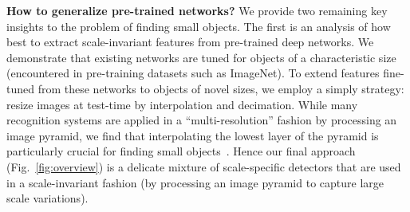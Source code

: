 \documentclass[10pt,twocolumn,letterpaper]{article}
\newcommand{\deva}[1]{\noindent \textcolor{red}{DEVA: #1}}
\begin{document}
\iffalse
\begin{figure}[t]
  \centering
  \texttt{[image: res/multi-task.pdf]}
  \caption{Traditional methods for recognizing objects across a range of scales aim for scale-invariant templates (left). This can be thought of as a large collection of scale-specific templates with shared parameters, where parameters are aligned into a canonical coordinate system by a geometric transformation. For example, a single set of model parameters are used to process both a 300x300 and 30x30 face. Alternatively, one can explicitly formalize scale-specific object detection as a multi-task problem (right) and let a (deep) feature representation algorithm {\em learn} how best to share features across different scales. \deva{Remove due to lack of space}.}
  \label{fig:multitask}
\end{figure}
\fi

{\bf How to generalize pre-trained networks?} We provide two remaining key insights to the problem of finding small objects. The first is an analysis of how best to extract scale-invariant features from pre-trained deep networks. We demonstrate that existing networks are tuned for objects of a characteristic size (encountered in pre-training datasets such as ImageNet).  To extend features fine-tuned from these networks to objects of novel sizes, we employ a simply strategy: resize images at test-time by interpolation and decimation. While many recognition systems are applied in a ``multi-resolution'' fashion by processing an image pyramid, we find that interpolating the lowest layer of the pyramid is particularly crucial for finding small objects~\cite{felzenszwalb2010object}. Hence our final approach  (Fig.~\ref{fig:overview}) is a delicate mixture of scale-specific detectors that are used in a scale-invariant fashion (by processing an image pyramid to capture large scale variations).
\end{document}

